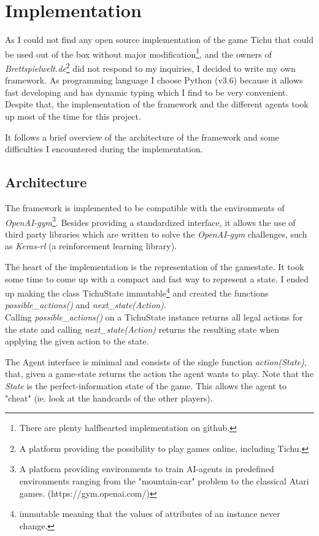 \chapter{Implementation}
\label{ch:impl}
As I could not find any open source implementation of the game Tichu that could be used out of the box without major modification\footnote{There are plenty halfhearted implementation on github.}, and the owners of \textit{Brettspielwelt.de}\footnote{A platform providing the possibility to play games online, including Tichu.} did not respond to my inquiries, I decided to write my own framework.
As programming language I choose Python (v3.6) because it allows fast developing and has dynamic typing which I find to be very convenient.
Despite that, the implementation of the framework and the different agents took up most of the time for this project.

It follows a brief overview of the architecture of the framework and some difficulties I encountered during the implementation.

\section{Architecture}
The framework is implemented to be compatible with the environments of \textit{OpenAI-gym}\footnote{A platform providing environments to train AI-agents in predefined environments ranging from the "mountain-car" problem to the classical Atari games. (https://gym.openai.com/)}. Besides providing a standardized interface, it allows the use of third party libraries which are written to solve the \textit{OpenAI-gym} challenges, such as \textit{Keras-rl} \cite{kerasrl} (a reinforcement learning library).

The heart of the implementation is the representation of the gamestate. It took some time to come up with a compact and fast way to represent a state. I ended up making the class TichuState immutable\footnote{immutable meaning that the values of attributes of an instance never change.} and created the functions \textit{possible\_actions()} and \textit{next\_state(Action)}. \\
Calling \textit{possible\_actions()} on a TichuState instance returns all legal actions for the state and calling \textit{next\_state(Action)} returns the resulting state when applying the given action to the state.

The Agent interface is minimal and consists of the single function \textit{action(State)}, that, given a game-state returns the action the agent wants to play. Note that the \textit{State} is the perfect-information state of the game. This allows the agent to "cheat" (ie. look at the handcards of the other players).

